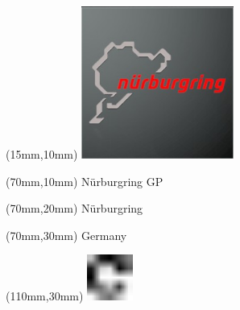 \null\newpage
\begin{textblock*}{50mm}(15mm,10mm)%
\includegraphics[width=50mm]{LG/2015-05-20_00089.png}
\end{textblock*}
\begin{textblock*}{130mm}(70mm,10mm)%
{\fontsize{20}{20}\selectfont Nürburgring GP}\\
\end{textblock*}
\begin{textblock*}{120mm}(70mm,20mm)%
{\fontsize{16}{16}\selectfont Nürburgring}\\
\end{textblock*}
\begin{textblock*}{120mm}(70mm,30mm)%
{\fontsize{12}{12}\selectfont Germany}
\end{textblock*}
\begin{textblock*}{30mm}(110mm,30mm)%
\centering
\includegraphics[height=15mm]{icons/fa-rotate-right.pdf}
\end{textblock*}
